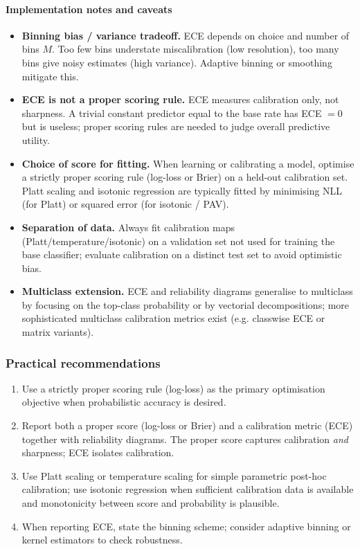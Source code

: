 \paragraph{Implementation notes and caveats}
\begin{itemize}
	\item \textbf{Binning bias / variance tradeoff.} ECE depends on choice and number of bins \(M\). Too few bins understate miscalibration (low resolution), too many bins give noisy estimates (high variance). Adaptive binning or smoothing mitigate this.
	\item \textbf{ECE is not a proper scoring rule.} ECE measures calibration only, not sharpness. A trivial constant predictor equal to the base rate has ECE \(=0\) but is useless; proper scoring rules are needed to judge overall predictive utility.
	\item \textbf{Choice of score for fitting.} When learning or calibrating a model, optimise a strictly proper scoring rule (log-loss or Brier) on a held-out calibration set. Platt scaling and isotonic regression are typically fitted by minimising NLL (for Platt) or squared error (for isotonic / PAV).
	\item \textbf{Separation of data.} Always fit calibration maps (Platt/temperature/isotonic) on a validation set not used for training the base classifier; evaluate calibration on a distinct test set to avoid optimistic bias.
	\item \textbf{Multiclass extension.} ECE and reliability diagrams generalise to multiclass by focusing on the top-class probability or by vectorial decompositions; more sophisticated multiclass calibration metrics exist (e.g. classwise ECE or matrix variants).
\end{itemize}

\subsubsection{Practical recommendations}
\begin{enumerate}
	\item Use a strictly proper scoring rule (log-loss) as the primary optimisation objective when probabilistic accuracy is desired.
	\item Report both a proper score (log-loss or Brier) and a calibration metric (ECE) together with reliability diagrams. The proper score captures calibration \emph{and} sharpness; ECE isolates calibration.
	\item Use Platt scaling or temperature scaling for simple parametric post-hoc calibration; use isotonic regression when sufficient calibration data is available and monotonicity between score and probability is plausible.
	\item When reporting ECE, state the binning scheme; consider adaptive binning or kernel estimators to check robustness.
\end{enumerate}

